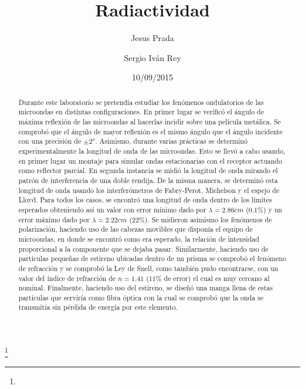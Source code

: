 \documentclass[%
 reprint,
 amsmath,amssymb,
 aps,
]{revtex4-1}
\begin{document}

\title{Radiactividad}%
\thanks{}%

\author{Jesus Prada}
\author{Sergio Iv\'an Rey}%
%

\date{10/09/2015}%

\begin{abstract}
Durante este laboratorio se pretendía estudiar los fenómenos ondulatorios de las microondas en distintas configuraciones. En primer lugar se verificó el ángulo de máxima reflexión de las microondas al hacerlas incidir sobre una película metálica. Se comprobó que el ángulo de mayor reflexión es el mismo ángulo que el ángulo incidente con una precisión de $\pm2^o$. Asimismo, durante varias prácticas se determinó experimentalmente la longitud de onda de las microondas. Esto se llevó a cabo usando, en primer lugar un montaje para simular ondas estacionarias con el receptor actuando como reflector parcial. En segunda instancia se midió la longitud de onda mirando el patrón de interferencia de una doble rendija. De la misma manera, se determinó esta longitud de onda usando los interferómetros de Fabry-Perot, Michelson y el espejo de Lloyd. Para todos los casos, se encontró una longitud de onda dentro de los límites esperados obteniendo así un valor con error mínimo dado por $\lambda = 2.86cm$ ($0.1\%$) y un error máximo dado por $\lambda= 2.22cm$ ($22\%$). Se midieron asimismo los fenómenos de polarización, haciendo uso de las cabezas movibles que disponía el equipo de microondas, en donde se encontró como era esperado, la relación de intensidad proporcional a la componente que se dejaba pasar. Similarmente, haciendo uso de partículas pequeñas de estireno ubicadas dentro de un prisma se comprobó el fenómeno de refracción y se comprobó la Ley de Snell, como también pudo encontrarse, con un valor del índice de refracción de $n = 1.41$ ($11\%$ de error) el cual es muy cercano al nominal. Finalmente, haciendo uso del estireno, se diseñó una manga llena de estas partículas que serviría como fibra óptica con la cual se comprobó que la onda se transmitía sin pérdida de energía por este elemento. \\
\end{abstract}
\end{document}
